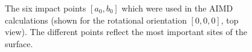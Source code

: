 \documentclass[11pt,DIV=13,BCOR=5mm,a4paper,headinclude]{scrbook}
\begin{document}
\begin{figure}[h!]
        \quad
        \quad
 \caption{The six impact points $[a_0,b_0]$ which were used in the AIMD calculations (shown for the rotational orientation $[0,0,0]$, top view). The different points reflect the most important sites of the surface. 
}
        \label{abb:impact_points}
 \end{figure}
 
\end{document}
